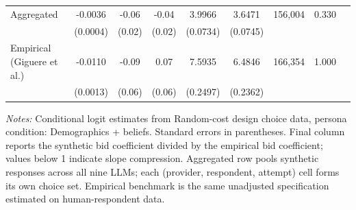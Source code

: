 \begin{table}[h]
{\begin{threeparttable}
\begin{tabular}{lcccccccr}
\midrule
Aggregated &   -0.0036 &     -0.06 &     -0.04 &    3.9966 &    3.6471 &   156,004 &  0.330 \\
 & (0.0004) & (0.02) & (0.02) & (0.0734) & (0.0745) & & \\
\midrule
Empirical (Giguere et al.) &   -0.0110 &     -0.09 &      0.07 &    7.5935 &    6.4846 &   166,354 & 1.000 \\
 & (0.0013) & (0.06) & (0.06) & (0.2497) & (0.2362) & & \\
\bottomrule
\end{tabular}
\begin{tablenotes}\footnotesize
\item \textit{Notes:} Conditional logit estimates from Random-cost design choice data, persona condition: Demographics + beliefs. 
Standard errors in parentheses. 
Final column reports the synthetic bid coefficient divided by the empirical bid coefficient; values below 1 indicate slope compression. 
Aggregated row pools synthetic responses across all nine LLMs; each (provider, respondent, attempt) cell forms its own choice set. 
Empirical benchmark is the same unadjusted specification estimated on \textcite{Giguere2020} human-respondent data.
\end{tablenotes}
\end{threeparttable}
}
\end{table}
